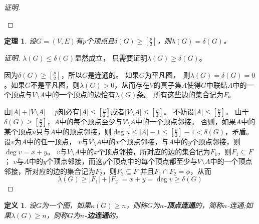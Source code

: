 \documentclass{book}[oneside]
\newtheorem{Def}{定义}[chapter]
\newtheorem{Thm}{定理}[chapter]
\begin{document}
\begin{CJK*}{UTF8}{gbsn}
\begin{proof}[证明]
\begin{center}
\end{center}

  \end{proof}
    \begin{Thm}
    设$G=(V,E)$有$p$个顶点且$\delta(G) \geq [ \frac{p}{2} ]$，则$\lambda(G) = \delta(G)$。
  \end{Thm}
  \begin{proof}[证明]
     $\lambda(G) \leq \delta(G)$显然成立， 只需要证明$\lambda(G) \geq \delta(G)$。

     

    因为$\delta(G) \geq [\frac{p}{2}]$，所以$G$是连通的。 如果$G$为平凡图，　则$\lambda (G) = \delta(G) = 0$。如果$G$不是平凡图，则$\lambda(G) > 0$，从而存在$V$的真子集$A$使得$G$中联结$A$中的一个顶点与$V\setminus A$中的一个顶点的边恰有$\lambda(G)$条。 所有这些边的集合记为$F$。

   由$|A| + |V\setminus A| = p$知必有$|A| \leq [\frac{p}{2}]$或者$|V\setminus A| \leq [\frac{p}{2}]$。 不妨设$|A| \leq [\frac{p}{2}]$。  由于$\delta(G) \geq [\frac{p}{2}]$，$A$中的每个顶点至少与$V\setminus A$中的一个顶点邻接。 否则，如果$A$中的某个顶点$u$只与$A$中的顶点邻接，则$\deg u \leq |A|-1 \leq [\frac{p}{2}] - 1 < \delta(G)$，矛盾。 
    设$v$为$A$中的任一顶点， $v$与$V\setminus A$中的$x$个顶点邻接，与$A$中的$y$个顶点邻接，则$\deg v = x + y$。  $v$与$V\setminus A$中的$x$个顶点邻接，所对应的边的集合记为$F_1$，则$F_1 \subseteq F$；
    $v$与$A$中的$y$个顶点邻接，而这$y$个顶点中的每个顶点都至少与$V\setminus A$中的一个顶点邻接，所对应的边的集合记为$F_2$，则$F_2 \subseteq F$ 并且$F_1 \cap F_2 = \phi$，从而
    \[\lambda(G) \geq |F_1| + |F_2| = x + y = \deg v \geq  \delta(G)\]
  \end{proof}

    \begin{Def}
    设$G$为一个图，如果$\kappa (G) \geq n$，则称$G$为{\bfseries $n$-顶点连通}的，简称$n$-连通;如果$\lambda (G) \geq n$，则称$G$为{\bfseries $n$-边连通}的。
  \end{Def}


\end{CJK*}
\end{document}
